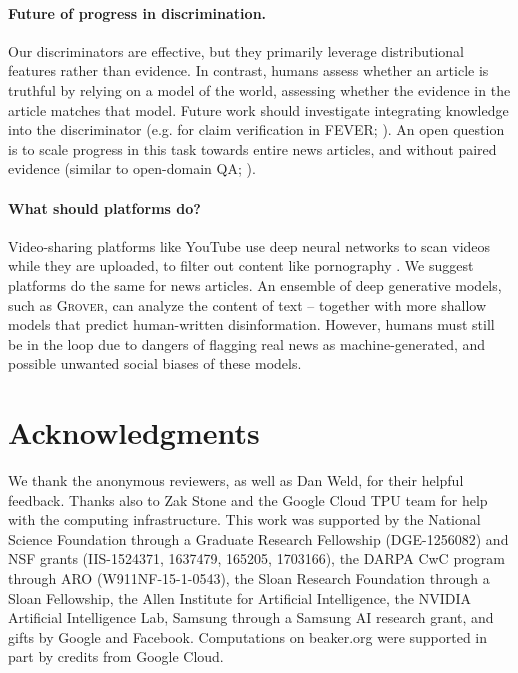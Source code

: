 \documentclass{article}
\newcommand{\modelname}{{\textsc{Grover}}}
\begin{document}
\paragraph{Future of progress in discrimination.} Our discriminators are effective, but they primarily leverage distributional features rather than evidence. In contrast, humans assess whether an article is truthful by relying on a model of the world, assessing whether the evidence in the article matches that model.  Future work should investigate integrating knowledge into the discriminator (e.g. for claim verification in FEVER; \citealp{thorne2018fever}).
An open question is to scale progress in this task towards entire news articles, and without paired evidence (similar to open-domain QA; \citealp{chen2017reading}).

\paragraph{What should platforms do?} Video-sharing platforms like YouTube use deep neural networks to scan videos while they are uploaded, to filter out content like pornography \citep{hosseini2017attacking}. We suggest platforms do the same for news articles. An ensemble of deep generative models, such as \modelname, can analyze the content of text -- together with more shallow models that predict human-written disinformation. However, humans must still be in the loop due to dangers of flagging real news as machine-generated, and possible unwanted social biases of these models.
 \vspace*{-2mm}
\section*{Acknowledgments}
\vspace*{-2mm}
We thank the anonymous reviewers, as well as Dan Weld, for their helpful feedback. Thanks also to Zak Stone and the Google Cloud TPU team for help with the computing infrastructure. This work was supported by the National Science Foundation through a Graduate Research Fellowship (DGE-1256082) and NSF grants (IIS-1524371, 1637479, 165205, 1703166), the DARPA CwC program through ARO (W911NF-15-1-0543), the Sloan Research Foundation through a Sloan Fellowship, the Allen Institute for Artificial Intelligence, the NVIDIA Artificial Intelligence Lab, Samsung through a Samsung AI research grant, and gifts by Google and Facebook. Computations on beaker.org were supported in part by credits from Google Cloud.
\end{document}
